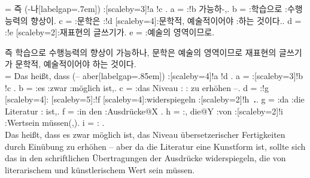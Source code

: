 \documentclass{article}  %
\begin{document}
\begin{CJK}{UTF8}{mj}
\vspace*{-3cm}

\begin{center}
\jtree[xunit=2em,yunit=1.5em]
\! = {즉} ({-나}[labelgap=.7em]) :[scaleby=3]!a !c .
\!a = :!b {가능하-,}.
\!b = :{학습으로} :{수행능력의\qquad} {향상이}.
\!c = :{문학은} :!d [scaleby=4]:{문학적, 예술적이어야\qquad\qquad\qquad} :{하는} {것이다.}.
\!d = :!e [scaleby=2]:{재표현의\qquad\quad} {글쓰기가}.
\!e = :{예술의\quad} {영역이므로}.
\endjtree\\[1em]
\end{center}

\noindent  즉 학습으로 수행능력의 향상이 가능하나,  문학은 예술의 영역이므로 재표현의 글쓰기가 문학적, 예술적이어야 하는 것이다.\\[3em]
\small
\hspace*{-3.35em}
\jtree[xunit=2em,yunit=1.5em]
\! = {Das heißt, dass} ({-- aber}[labelgap=.85em]) :[scaleby=4]!a !d .
\!a = :[scaleby=3]!b !c .
\!b = :{es\quad} :{zwar\quad} :{möglich} {\quad ist,}.
\!c = :{das Niveau\qquad} :{\qquad\qquad} :{} {\qquad\quad zu erhöhen --}.
\!d = :!g [scaleby=4]:{} [scaleby=5]:!f [scaleby=4]:{widerspiegeln\qquad} :[scaleby=2]!h {\qquad\,\textbf{.}}.
\!g = :{da\quad} :{die Literatur\qquad} :{} {\quad ist,}.
\!f = :{in den\qquad} :{\qquad\qquad}{\qquad\quad Ausdrücke}@X .
\!h = :{, die\quad}@Y :{von\quad} :[scaleby=2]!i :{Wert\quad}{\quad sein müssen(,)}.
\!i = :{\qquad} {}.
\endjtree\\[1em]

\normalsize\noindent
Das heißt, dass es zwar möglich ist, das Niveau übersetzerischer Fertigkeiten durch Einübung zu erhöhen -- aber da die Literatur eine Kunstform ist, sollte sich das in den schriftlichen Übertragungen der Ausdrücke widerspiegeln, die von literarischem und künstlerischem Wert sein müssen.

\end{CJK}
\end{document}
